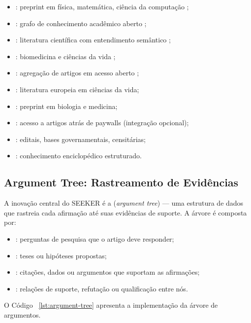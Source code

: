 \begin{itemize}
\item {}: preprint em física, matemática, ciência da
computação \cite{arxiv2024};
\item {}: grafo de conhecimento acadêmico aberto
\cite{priem2022openalex};
\item {}: literatura científica com
entendimento semântico \cite{ammar2018semantic};
\item {}: biomedicina e ciências da vida
\cite{PubMed2024};
\item {}: agregação de artigos em acesso aberto
\cite{knoth2014core};
\item {}: literatura europeia em ciências da vida;
\item {}: preprint em biologia e medicina;
\item {}: acesso a artigos atrás de paywalls
(integração opcional);
\item {}: editais, bases governamentais,
censitárias;
\item {}: conhecimento enciclopédico
estruturado.
\end{itemize}

\subsection{Argument Tree: Rastreamento de Evidências}

A inovação central do SEEKER é a 
(\textit{argument tree}) — uma estrutura de dados que rastreia cada
afirmação até suas evidências de suporte. A árvore é composta por:

\begin{itemize}
\item {}: perguntas de pesquisa que o artigo
deve responder;
\item {}: teses ou hipóteses propostas;
\item {}: citações, dados ou argumentos que
suportam as afirmações;
\item {}: relações de suporte, refutação
ou qualificação entre nós.
\end{itemize}

O Código~ \ref{lst:argument-tree} apresenta a implementação da
árvore de argumentos.

